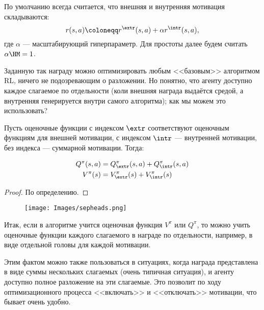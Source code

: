 По умолчанию всегда считается, что внешняя и внутренняя мотивация складываются:
\begin{equation}\label{sumgoal}
r(s, a) \coloneqq r^{\extr}(s, a) + \alpha r^{\intr}(s, a),
\end{equation}
где $\alpha$ --- масштабирующий гиперпараметр. Для простоты далее будем считать $\alpha \HM= 1$.

Заданную так награду можно оптимизировать любым <<базовым>> алгоритмом RL, ничего не подозревающим о разложении. Но понятно, что агенту доступно каждое слагаемое по отдельности (коли внешняя награда выдаётся средой, а внутренняя генерируется внутри самого алгоритма); как мы можем это использовать?

Пусть оценочные функции с индексом $\extr$ соответствуют оценочным функциям для внешней мотивации, с индексом $\intr$ --- внутренней мотивации, без индекса --- суммарной мотивации. Тогда:
\begin{proposition}
\begin{equation}\label{valuefunctionssum}
\begin{aligned}
Q^\pi(s, a) &= Q^\pi_{\extr}(s, a) + Q^\pi_{\intr}(s, a) \\
V^\pi(s) &= V^\pi_{\extr}(s) + V^\pi_{\intr}(s)
\end{aligned}
\end{equation}
\begin{proof}
По определению.
\end{proof}
\end{proposition}

\begin{wrapfigure}{r}{0.35\textwidth}
\centering
\texttt{[image: Images/sepheads.png]}
\end{wrapfigure}

Итак, если в алгоритме учится оценочная функция $V^\pi$ или $Q^\pi$, то можно учить оценочные функции каждого слагаемого в награде по отдельности, например, в виде отдельной головы для каждой мотивации. 

\begin{remark}
Этим фактом можно также пользоваться в ситуациях, когда награда представлена в виде суммы нескольких слагаемых (очень типичная ситуация), и агенту доступно полное разложение на эти слагаемые. Это позволит по ходу оптимизационного процесса <<включать>> и <<отключать>> мотивации, что бывает очень удобно.
\end{remark}

